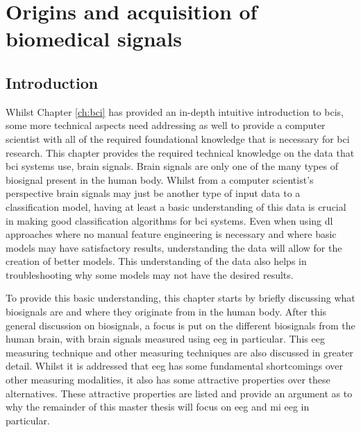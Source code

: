 




\chapter{Origins and acquisition of biomedical signals}
\label{ch:biomedical_signals}

\section{Introduction}
\label{sec:biomedical_signals_introduction}

Whilst Chapter \ref{ch:bci} has provided an in-depth intuitive introduction to \glspl{bci}, some more technical aspects need addressing as well to provide a computer scientist with all of the required foundational knowledge that is necessary for \gls{bci} research.
This chapter provides the required technical knowledge on the data that \gls{bci} systems use, brain signals.
Brain signals are only one of the many types of \gls{biosignal} present in the human body.
Whilst from a computer scientist's perspective brain signals may just be another type of input data to a classification model, having at least a basic understanding of this data is crucial in making good classification algorithms for \gls{bci} systems.
Even when using \gls{dl} approaches where no manual feature engineering is necessary and where basic models may have satisfactory results, understanding the data will allow for the creation of better models.
This understanding of the data also helps in troubleshooting why some models may not have the desired results.

To provide this basic understanding, this chapter starts by briefly discussing what \glspl{biosignal} are and where they originate from in the human body.
After this general discussion on \glspl{biosignal}, a focus is put on the different \glspl{biosignal} from the human brain, with brain signals measured using \gls{eeg} in particular.
This \gls{eeg} measuring technique and other measuring techniques are also discussed in greater detail.
Whilst it is addressed that \gls{eeg} has some fundamental shortcomings over other measuring modalities, it also has some attractive properties over these alternatives.
These attractive properties are listed and provide an argument as to why the remainder of this master thesis will focus on \gls{eeg} and \gls{mi} \gls{eeg} in particular.

